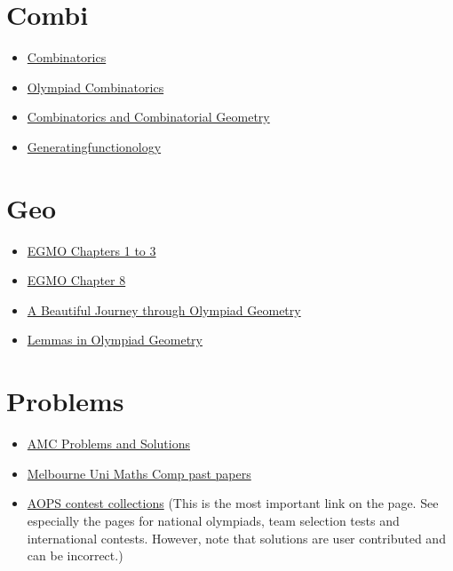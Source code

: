 \section{Combi}
\begin{itemize}
  \item \href{http://math.sun.ac.za/swagner/Combinatorics.pdf}{Combinatorics}
  \item
    \href{https://drive.google.com/file/d/1sQtirXxkEfWYuGSKDZ-d7VGYkR_idebY/view}
    {Olympiad Combinatorics}
  \item
    \href{https://drive.google.com/file/d/1pkgUjWs4ArL9Huq712NO1RtuAvXjr3d9/view?usp=sharing}
    {Combinatorics and Combinatorial Geometry}
  \item \href{https://www2.math.upenn.edu/~wilf/gfologyLinked2.pdf}
      {Generatingfunctionology}
\end{itemize}

\section{Geo}
\begin{itemize}
  \item
    \href{https://books.google.com/books?id=47UaDAAAQBAJ&lpg=PP1&pg=PP1#v=onepage&q&f=false}
    {EGMO Chapters 1 to 3}
  \item
    \href{https://www.maa.org/sites/default/files/pdf/ebooks/pdf/EGMO_chapter8.pdf}
    {EGMO Chapter 8}
  \item \href{https://www.olympiadgeometry.com/the-book.html} {A Beautiful
      Journey through Olympiad Geometry}
  \item \href{https://yufeizhao.com/olympiad/geolemmas.pdf} {Lemmas in Olympiad
      Geometry}
\end{itemize}

\section{Problems}
\begin{itemize}
  \item
      \href{https://artofproblemsolving.com/wiki/index.php/AMC_Problems_and_Solutions}{AMC
      Problems and Solutions}
  \item \href{https://mathscomp.ms.unimelb.edu.au/past-papers/} {Melbourne Uni
      Maths Comp past papers}
  \item 
    \href{https://artofproblemsolving.com/community/c13}
    {AOPS contest collections} (This is the most important link on the page.
    See especially the pages for national olympiads,
    team selection tests and international contests. However, note that solutions are
    user contributed and can be incorrect.)
\end{itemize}

